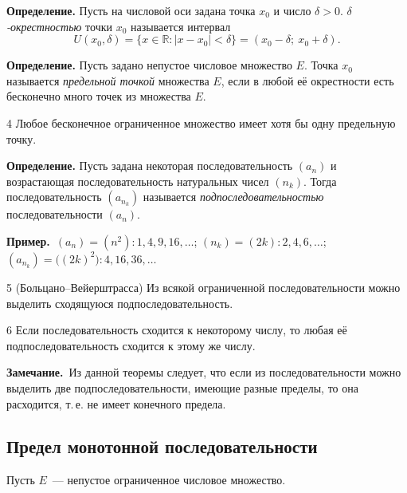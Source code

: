 \documentclass[a4paper,11pt]{article}
\newcommand{\zam}{\textbf{Замечание.}\ }
\newcommand{\prim}{\textbf{Пример.}\ }
\begin{document}
\begin{opr}
\textbf{Определение.} Пусть на числовой оси задана точка $x_0$ и число $\delta > 0$.
\emph{$\delta$-окрестностью} точки $x_0$ называется интервал
\[
  U(x_0, \delta) = \{x \in \mathbb{R} : |x - x_0| < \delta\} = (x_0 - \delta;\ x_0 + \delta).
\]
\end{opr}

\begin{opr}
\textbf{Определение.} Пусть задано непустое числовое множество $E$. Точка $x_0$ называется
\emph{предельной точкой} множества $E$, если в любой её окрестности есть бесконечно много точек
из множества $E$.
\end{opr}

\begin{teor}{4}
  Любое бесконечное ограниченное множество имеет хотя бы одну предельную точку.
\end{teor}

\begin{opr}
\textbf{Определение.} Пусть задана некоторая последовательность $(a_n)$ и возрастающая
последовательность натуральных чисел $(n_k)$. Тогда последовательность $(a_{n_k})$ называется
\emph{подпоследовательностью} последовательности $(a_n)$.
\end{opr}

\prim $(a_n) = (n^2)\colon 1, 4, 9, 16, \dots$; \quad $(n_k) = (2k)\colon 2, 4, 6, \dots$; \quad
$(a_{n_k}) = \big((2k)^2\big)\colon 4, 16, 36, \dots$

\begin{teor}{5 (Больцано--Вейерштрасса)}
  Из всякой ограниченной последовательности можно выделить сходящуюся подпоследовательность.
\end{teor}

\begin{teor}{6}
  Если последовательность сходится к некоторому числу, то любая её подпоследовательность сходится
  к этому же числу.
\end{teor}

\zam Из данной теоремы следует, что если из последовательности можно выделить
две подпоследовательности, имеющие разные пределы, то она расходится, т.\,е. не имеет конечного предела.

\subsection{Предел монотонной последовательности}

Пусть $E$~--- непустое ограниченное числовое множество.
\end{document}
